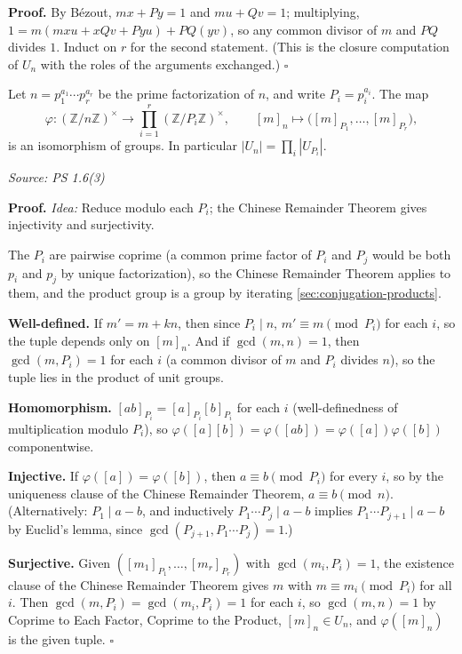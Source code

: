 \documentclass[11pt]{report}
\renewenvironment{proof}[1][Proof]{\noindent\textbf{#1.} }{\hfill$\square$\par\vspace{5pt}}
\newcommand{\srcline}[1]{\par\hfill{\footnotesize\textit{Source: #1}}}
\begin{document}
\begin{proof}
By B\'ezout, $mx + Py = 1$ and $mu + Qv = 1$; multiplying, $1 = m(mxu + xQv + Pyu) + PQ(yv)$, so any common divisor of $m$ and $PQ$ divides $1$. Induct on $r$ for the second statement. (This is the closure computation of $U_n$ with the roles of the arguments exchanged.)
\end{proof}

\begin{thmbox}\label{thm:un-product-prime-power-unit-groups}
Let $n = p_1^{a_1} \cdots p_r^{a_r}$ be the prime factorization of $n$, and write $P_i = p_i^{a_i}$. The map
\[ \varphi: (\mathbb{Z}/n\mathbb{Z})^\times \to \prod_{i=1}^r (\mathbb{Z}/P_i\mathbb{Z})^\times, \qquad [m]_n \mapsto \big([m]_{P_1}, \ldots, [m]_{P_r}\big), \]
is an isomorphism of groups. In particular $|U_n| = \prod_i |U_{P_i}|$.
\srcline{PS 1.6(3)}
\end{thmbox}

\begin{proof}
\textit{Idea:} Reduce modulo each $P_i$; the Chinese Remainder Theorem gives injectivity and surjectivity.\par
The $P_i$ are pairwise coprime (a common prime factor of $P_i$ and $P_j$ would be both $p_i$ and $p_j$ by unique factorization), so the Chinese Remainder Theorem applies to them, and the product group is a group by iterating \ref{sec:conjugation-products}.

\textbf{Well-defined.} If $m' = m + kn$, then since $P_i \mid n$, $m' \equiv m \pmod{P_i}$ for each $i$, so the tuple depends only on $[m]_n$. And if $\gcd(m, n) = 1$, then $\gcd(m, P_i) = 1$ for each $i$ (a common divisor of $m$ and $P_i$ divides $n$), so the tuple lies in the product of unit groups.

\textbf{Homomorphism.} $[ab]_{P_i} = [a]_{P_i}[b]_{P_i}$ for each $i$ (well-definedness of multiplication modulo $P_i$), so $\varphi([a][b]) = \varphi([ab]) = \varphi([a])\varphi([b])$ componentwise.

\textbf{Injective.} If $\varphi([a]) = \varphi([b])$, then $a \equiv b \pmod{P_i}$ for every $i$, so by the uniqueness clause of the Chinese Remainder Theorem, $a \equiv b \pmod n$. (Alternatively: $P_1 \mid a - b$, and inductively $P_1 \cdots P_j \mid a - b$ implies $P_1 \cdots P_{j+1} \mid a - b$ by Euclid's lemma, since $\gcd(P_{j+1}, P_1 \cdots P_j) = 1$.)

\textbf{Surjective.} Given $([m_1]_{P_1}, \ldots, [m_r]_{P_r})$ with $\gcd(m_i, P_i) = 1$, the existence clause of the Chinese Remainder Theorem gives $m$ with $m \equiv m_i \pmod{P_i}$ for all $i$. Then $\gcd(m, P_i) = \gcd(m_i, P_i) = 1$ for each $i$, so $\gcd(m, n) = 1$ by Coprime to Each Factor, Coprime to the Product, $[m]_n \in U_n$, and $\varphi([m]_n)$ is the given tuple.
\end{proof}
\end{document}
